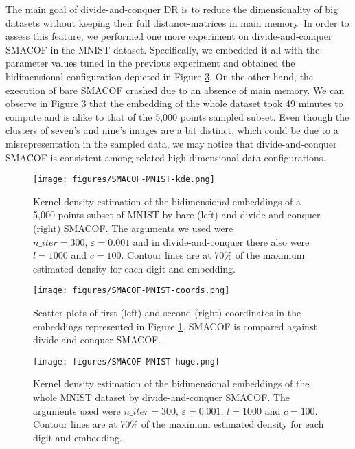 The main goal of divide-and-conquer DR is to reduce the dimensionality of big datasets without keeping their full distance-matrices in main memory. In order to assess this feature, we performed one more experiment on divide-and-conquer SMACOF in the MNIST dataset. Specifically, we embedded it all with the parameter values tuned in the previous experiment and obtained the bidimensional configuration depicted in Figure \ref{fig:SMACOF-MNIST-huge}. On the other hand, the execution of bare SMACOF crashed due to an absence of main memory. We can observe in Figure \ref{fig:SMACOF-MNIST-huge} that the embedding of the whole dataset took 49 minutes to compute and is alike to that of the 5,000 points sampled subset. Even though the clusters of seven's and nine's images are a bit distinct, which could be due to a misrepresentation in the sampled data, we may notice that divide-and-conquer SMACOF is consistent among related high-dimensional data configurations.

\begin{figure}
    \centering
    \texttt{[image: figures/SMACOF-MNIST-kde.png]}
    \caption{Kernel density estimation of the bidimensional embeddings of a 5,000 points subset of MNIST by bare (left) and divide-and-conquer (right) SMACOF. The arguments we used were $n\_iter = 300,\, \varepsilon = 0.001$ and in divide-and-conquer there also were $l=1000$ and $c=100$. Contour lines are at 70\% of the maximum estimated density for each digit and embedding.}
    \label{fig:SMACOF-MNIST-kde}
\end{figure}

\begin{figure}
    \centering
    \texttt{[image: figures/SMACOF-MNIST-coords.png]}
    \caption{Scatter plots of first (left) and second (right) coordinates in the embeddings represented in Figure \ref{fig:SMACOF-MNIST-kde}. SMACOF is compared against divide-and-conquer SMACOF.}
    \label{fig:SMACOF-MNIST-coords}
\end{figure}

\begin{figure}
    \centering
    \texttt{[image: figures/SMACOF-MNIST-huge.png]}
    \caption{Kernel density estimation of the bidimensional embeddings of the whole MNIST dataset by divide-and-conquer SMACOF. The arguments used were $n\_iter = 300,\, \varepsilon = 0.001, \, l=1000$ and $c=100$. Contour lines are at 70\% of the maximum estimated density for each digit and embedding.}
    \label{fig:SMACOF-MNIST-huge}
\end{figure}

